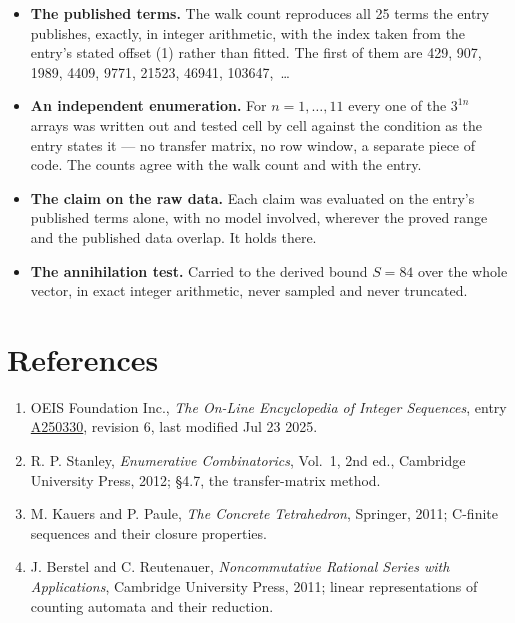\documentclass[11pt]{article}
\theoremstyle{definition}
\begin{document}
\begin{itemize}

\item {\bfseries The published terms.} The walk count reproduces all 25 terms the entry publishes, exactly, in integer arithmetic, with the index taken from the entry's stated offset (1) rather than fitted. The first of them are 429, 907, 1989, 4409, 9771, 21523, 46941, 103647,~\dots

\item {\bfseries An independent enumeration.} For $n = 1,\dots,11$ every one of the $3^{1n}$ arrays was written out and tested cell by cell against the condition as the entry states it --- no transfer matrix, no row window, a separate piece of code. The counts agree with the walk count and with the entry.

\item {\bfseries The claim on the raw data.} Each claim was evaluated on the entry's published terms alone, with no model involved, wherever the proved range and the published data overlap. It holds there.

\item {\bfseries The annihilation test.} Carried to the derived bound $S = 84$ over the whole vector, in exact integer arithmetic, never sampled and never truncated.

\end{itemize}

\section{References}

\begin{enumerate}

\item OEIS Foundation Inc., \emph{The On-Line Encyclopedia of Integer Sequences}, entry \href{https://oeis.org/A250330}{A250330}, revision 6, last modified Jul 23 2025.

\item R. P. Stanley, \emph{Enumerative Combinatorics}, Vol.~1, 2nd ed., Cambridge University Press, 2012; \S4.7, the transfer-matrix method.

\item M. Kauers and P. Paule, \emph{The Concrete Tetrahedron}, Springer, 2011; C-finite sequences and their closure properties.

\item J. Berstel and C. Reutenauer, \emph{Noncommutative Rational Series with Applications}, Cambridge University Press, 2011; linear representations of counting automata and their reduction.

\end{enumerate}
\end{document}
